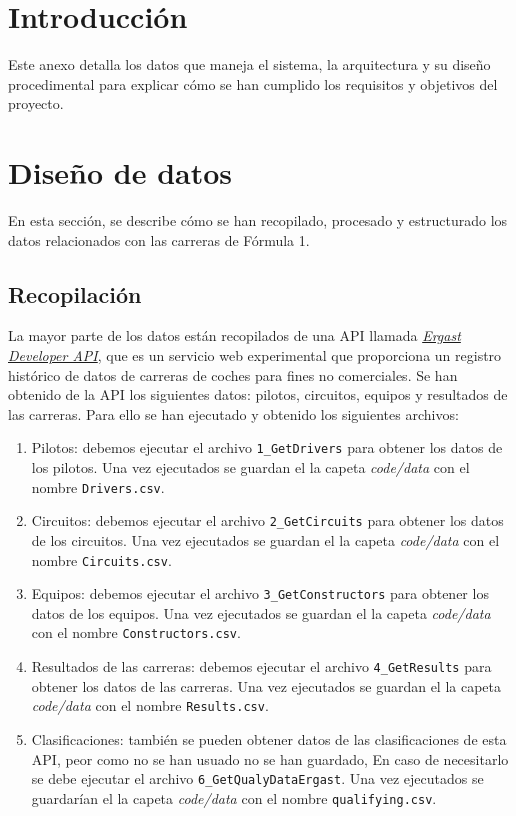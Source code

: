 
\section{Introducción}

Este anexo detalla los datos que maneja el sistema, la arquitectura y su diseño procedimental para explicar cómo se han cumplido los requisitos y objetivos del proyecto.

\section{Diseño de datos}

En esta sección, se describe cómo se han recopilado, procesado y estructurado los datos relacionados con las carreras de Fórmula 1.

\subsection{Recopilación}

La mayor parte de los datos están recopilados de una API llamada \href{https://ergast.com/mrd/}{\textit{Ergast Developer API}}, que es un servicio web experimental que proporciona un registro histórico de datos de carreras de coches para fines no comerciales. Se han obtenido de la API los siguientes datos: pilotos, circuitos, equipos y resultados de las carreras. Para ello se han ejecutado y obtenido los siguientes archivos:
\begin{enumerate}
    \item Pilotos: debemos ejecutar el archivo \texttt{1\_GetDrivers} para obtener los datos de los pilotos. Una vez ejecutados se guardan el la capeta \textit{code/data} con el nombre \texttt{Drivers.csv}.
    \item Circuitos: debemos ejecutar el archivo \texttt{2\_GetCircuits} para obtener los datos de los circuitos. Una vez ejecutados se guardan el la capeta \textit{code/data} con el nombre \texttt{Circuits.csv}.
    \item Equipos: debemos ejecutar el archivo \texttt{3\_GetConstructors} para obtener los datos de los equipos. Una vez ejecutados se guardan el la capeta \textit{code/data} con el nombre \texttt{Constructors.csv}.
    \item Resultados de las carreras: debemos ejecutar el archivo \texttt{4\_GetResults} para obtener los datos de las carreras. Una vez ejecutados se guardan el la capeta \textit{code/data} con el nombre \texttt{Results.csv}.
    \item Clasificaciones: también se pueden obtener datos de las clasificaciones de esta API, peor como no se han usuado no se han guardado, En caso de necesitarlo se debe ejecutar el archivo \texttt{6\_GetQualyDataErgast}. Una vez ejecutados se guardarían el la capeta \textit{code/data} con el nombre \texttt{qualifying.csv}.
\end{enumerate}

